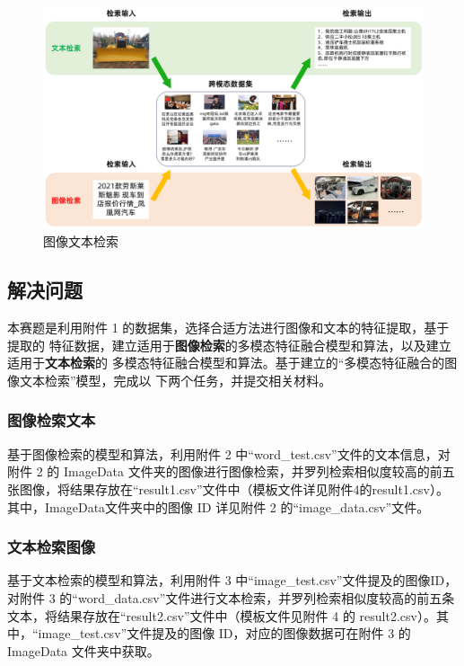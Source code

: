 \documentclass[a4paper]{zreport}
\begin{document}
\begin{figure}[h]
\centering
\includegraphics[width=0.9\linewidth]{figures/problem1}
\caption{图像文本检索}
\label{fig:problem1}
\end{figure}

\subsection{解决问题}

本赛题是利用附件 1 的数据集，选择合适方法进行图像和文本的特征提取，基于提取的
特征数据，建立适用于\textbf{图像检索}的多模态特征融合模型和算法，以及建立适用于\textbf{文本检索}的
多模态特征融合模型和算法。基于建立的“多模态特征融合的图像文本检索”模型，完成以
下两个任务，并提交相关材料。

\subsubsection[图像检索文本]{\textbf{图像检索文本}}

基于图像检索的模型和算法，利用附件 2 中“word\_test.csv”文件的文本信息，对附件 2 的 ImageData 文件夹的图像进行图像检索，并罗列检索相似度较高的前五张图像，将结果存放在“result1.csv”文件中（模板文件详见附件4的result1.csv）。其中，ImageData文件夹中的图像 ID 详见附件 2 的“image\_data.csv”文件。

\subsubsection[文本检索图像]{\textbf{文本检索图像}}

基于文本检索的模型和算法，利用附件 3 中“image\_test.csv”文件提及的图像ID，对附件 3 的“word\_data.csv”文件进行文本检索，并罗列检索相似度较高的前五条文本，将结果存放在“result2.csv”文件中（模板文件见附件 4 的 result2.csv）。其中，“image\_test.csv”文件提及的图像 ID，对应的图像数据可在附件 3 的 ImageData 文件夹中获取。
\end{document}
